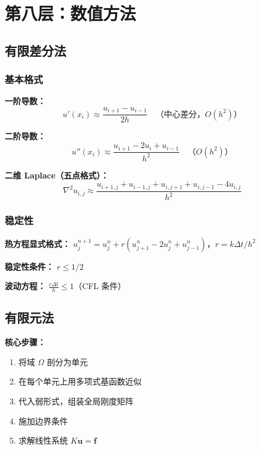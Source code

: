 \section{第八层：数值方法}
\label{sec:de-numerics}

\subsection{有限差分法}

\subsubsection{基本格式}

\textbf{一阶导数：}
\[
u'(x_i) \approx \frac{u_{i+1} - u_{i-1}}{2h} \quad \text{（中心差分，$O(h^2)$）}
\]

\textbf{二阶导数：}
\[
u''(x_i) \approx \frac{u_{i+1} - 2u_i + u_{i-1}}{h^2} \quad \text{（$O(h^2)$）}
\]

\textbf{二维 Laplace（五点格式）：}
\[
\nabla^2 u_{i,j} \approx \frac{u_{i+1,j} + u_{i-1,j} + u_{i,j+1} + u_{i,j-1} - 4u_{i,j}}{h^2}
\]

\subsubsection{稳定性}

\textbf{热方程显式格式：} $u_j^{n+1} = u_j^n + r(u_{j+1}^n - 2u_j^n + u_{j-1}^n)$，$r = k\Delta t/h^2$

\textbf{稳定性条件：} $r \leq 1/2$

\textbf{波动方程：} $\frac{c\Delta t}{h} \leq 1$（CFL 条件）

\subsection{有限元法}

\textbf{核心步骤：}
\begin{enumerate}
  \item 将域 $\Omega$ 剖分为单元
  \item 在每个单元上用多项式基函数近似
  \item 代入弱形式，组装全局刚度矩阵
  \item 施加边界条件
  \item 求解线性系统 $K\mathbf{u} = \mathbf{f}$
\end{enumerate}

